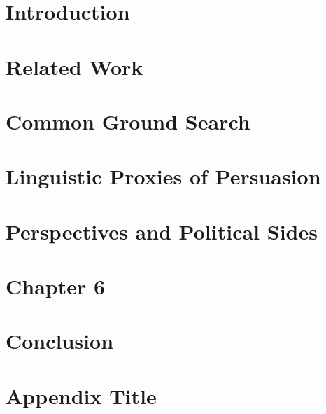 \documentclass[12pt,lot, lof]{outhesis}
\begin{document}

\makefrontmatter







\chapter{Introduction}


\chapter{Related Work}


\chapter{Common Ground Search}


\chapter{Linguistic Proxies of Persuasion}


\chapter{Perspectives and Political Sides}


\chapter{Chapter 6}


\chapter{Conclusion}



% 


\printglossary[type=\acronymtype]
\printglossary

\appendix
\chapter{Appendix Title}

\end{document}
